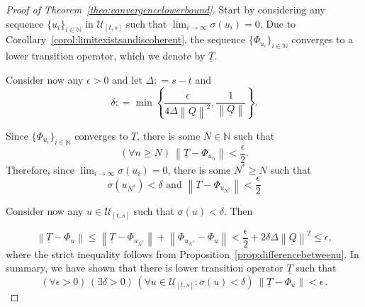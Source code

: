 \documentclass[10pt]{paper}
\theoremstyle{definition}
\newcommand{\nats}{\mathbb{N}}
\newcommand{\lt}{\underline{T}}
\newcommand{\lrate}{\underline{Q}}
\newcommand{\norm}[1]{\left\lVert #1 \right\rVert}
\newcommand{\coloneqq}{:\!=}
\begin{document}
\begin{proof}[Proof of Theorem~\ref{theo:convergencelowerbound}]
Start by considering any sequence $\{u_i\}_{i\in\nats}$ in $\mathcal{U}_{[t,s]}$ such that $\lim_{i\to\infty}\sigma(u_i)=0$. Due to Corollary~\ref{corol:limitexistsandiscoherent}, the sequence $\{\Phi_{u_i}\}_{i\in\nats}$ converges to a lower transition operator, which we denote by $\lt$. 

Consider now any $\epsilon>0$ and let $\Delta\coloneqq s-t$ and
\begin{equation*}
\delta\coloneqq\min\left\{\frac{\epsilon}{4\Delta\norm{\lrate}^2},\frac{1}{\norm{\lrate}}\right\}.
\end{equation*}

\noindent Since $\{\Phi_{u_i}\}_{i\in\nats}$ converges to $\lt$, there is some $N\in\nats$ such that
\begin{equation*}
(\forall n\geq N)~\norm{\lt - \Phi_{u_n}}<\frac{\epsilon}{2}.
\end{equation*}
Therefore, since $\lim_{i\to\infty}\sigma(u_i)=0$, there is some $N^*\geq N$ such that
\begin{equation*}
\sigma(u_{N^*})<\delta\text{ and }\norm{\lt - \Phi_{u_{N^*}}}<\frac{\epsilon}{2}
\end{equation*}

\noindent Consider now any $u\in\mathcal{U}_{[t,s]}$ such that $\sigma(u)<\delta$. Then

\begin{equation*}
\norm{\lt - \Phi_u}\leq\norm{\lt-\Phi_{u_{N^*}}}
+\norm{\Phi_{u_{N^*}}-\Phi_u}
<\frac{\epsilon}{2}+2\delta\Delta\norm{\lrate}^2\leq\epsilon,
\end{equation*}
where the strict inequality follows from Proposition~\ref{prop:differencebetweenu}.
In summary, we have shown that there is lower transition operator $\lt$ such that
\begin{equation*}
(\forall\epsilon>0)\,
(\exists\delta>0)\,
(\forall u\in\mathcal{U}_{[t,s]}\colon\sigma(u)<\delta)~\norm{\lt - \Phi_u}<\epsilon\,.
\end{equation*}
\end{proof}
\end{document}
